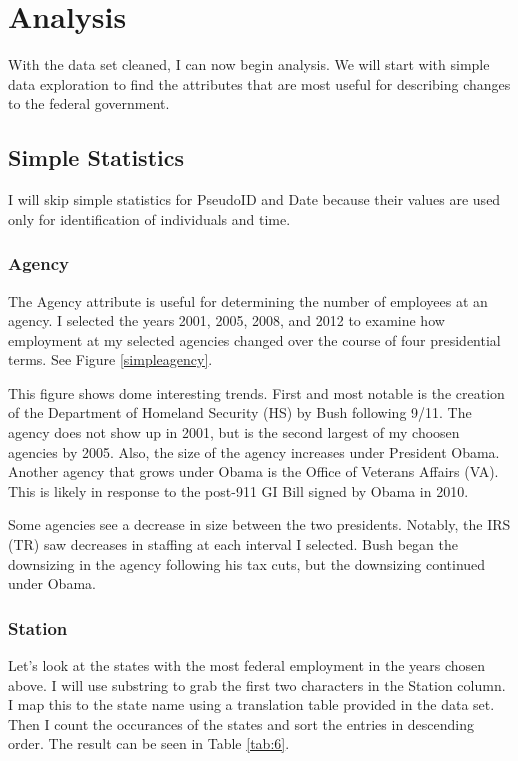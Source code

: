 \documentclass{article}
\begin{document}
\section{Analysis}
With the data set cleaned, I can now begin analysis. We will start with simple data exploration to find the attributes that are most useful for describing changes to the federal government.

    \subsection{Simple Statistics}
    I will skip simple statistics for PseudoID and Date because their values are used only for identification of individuals and time.

        \subsubsection{Agency}
        The Agency attribute is useful for determining the number of employees at an agency. I selected the years 2001, 2005, 2008, and 2012 to examine how employment at my selected agencies changed over the course of four presidential terms. See Figure \ref{simpleagency}.
        \par
        This figure shows dome interesting trends. First and most notable is the creation of the Department of Homeland Security (HS) by Bush following 9/11. The agency does not show up in 2001, but is the second largest of my choosen agencies by 2005. Also, the size of the agency increases under President Obama. Another agency that grows under Obama is the Office of Veterans Affairs (VA). This is likely in response to the post-911 GI Bill signed by Obama in 2010.
        \par
        Some agencies see a decrease in size between the two presidents. Notably, the IRS (TR) saw decreases in staffing at each interval I selected. Bush began the downsizing in the agency following his tax cuts, but the downsizing continued under Obama.

        \subsubsection{Station}
        Let's look at the states with the most federal employment in the years chosen above. I will use substring to grab the first two characters in the Station column. I map this to the state name using a translation table provided in the data set. Then I count the occurances of the states and sort the entries in descending order. The result can be seen in Table \ref{tab:6}.
\end{document}
